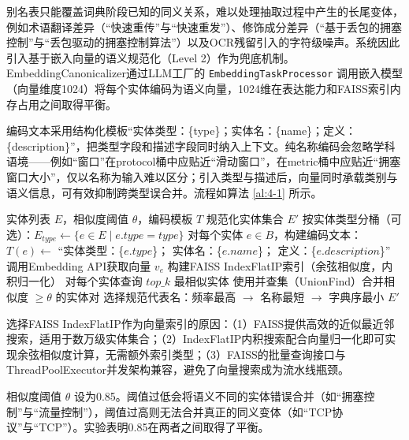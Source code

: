 别名表只能覆盖词典阶段已知的同义关系，难以处理抽取过程中产生的长尾变体，例如术语翻译差异（“快速重传”与“快速重发”）、修饰成分差异（“基于丢包的拥塞控制”与“丢包驱动的拥塞控制算法”）以及OCR残留引入的字符级噪声。系统因此引入基于嵌入向量的语义规范化（Level 2）作为兜底机制。EmbeddingCanonicalizer通过LLM工厂的 \texttt{EmbeddingTaskProcessor} 调用嵌入模型（向量维度1024）将每个实体编码为语义向量，1024维在表达能力和FAISS索引内存占用之间取得平衡。

编码文本采用结构化模板“实体类型：\{type\}；实体名：\{name\}；定义：\{description\}”，把类型字段和描述字段同时纳入上下文。纯名称编码会忽略学科语境——例如“窗口”在protocol桶中应贴近“滑动窗口”，在metric桶中应贴近“拥塞窗口大小”，仅以名称为输入难以区分；引入类型与描述后，向量同时承载类别与语义信息，可有效抑制跨类型误合并。流程如算法 \ref{al:4-1} 所示。

\begin{algorithm}[H]
    \caption{基于FAISS的嵌入实体规范化}\label{al:4-1}
    \begin{algorithmic}[1]
        \Require 实体列表 $E$，相似度阈值 $\theta$，编码模板 $T$
        \Ensure 规范化实体集合 $E'$
        \State 按实体类型分桶（可选）：$E_{type} \gets \{e \in E \mid e.type = type\}$
            \State 对每个实体 $e \in B$，构建编码文本：
            \Statex \hspace{2em} $T(e) \gets$ ``实体类型：\{$e.type$\}；
            \Statex \hspace{4em} 实体名：\{$e.name$\}；
            \Statex \hspace{4em} 定义：\{$e.description$\}''
            \State 调用Embedding API获取向量 $v_e$
            \State 构建FAISS IndexFlatIP索引（余弦相似度，内积归一化）
            \State 对每个实体查询 $top\_k$ 最相似实体
            \State 使用并查集（UnionFind）合并相似度 $\geq \theta$ 的实体对
            \State 选择规范代表名：频率最高 $\to$ 名称最短 $\to$ 字典序最小
        \EndFor
        \State \Return $E'$
    \end{algorithmic}
\end{algorithm}

选择FAISS IndexFlatIP作为向量索引的原因：（1）FAISS提供高效的近似最近邻搜索，适用于数万级实体集合；（2）IndexFlatIP内积搜索配合向量归一化即可实现余弦相似度计算，无需额外索引类型；（3）FAISS的批量查询接口与ThreadPoolExecutor并发架构兼容，避免了向量搜索成为流水线瓶颈。

相似度阈值 $\theta$ 设为0.85。阈值过低会将语义不同的实体错误合并（如“拥塞控制”与“流量控制”），阈值过高则无法合并真正的同义变体（如“TCP协议”与“TCP”）。实验表明0.85在两者之间取得了平衡。

